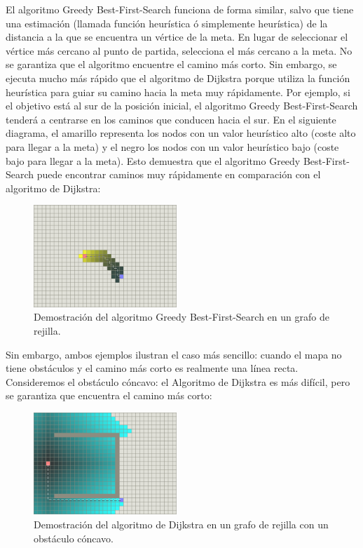 \documentclass[reprint,amsmath,amssymb,aps]{revtex4-2}
\begin{document}
El algoritmo Greedy Best-First-Search funciona de forma similar, salvo que tiene una estimación (llamada función heurística ó simplemente heurística) de la distancia a la que se encuentra un vértice de la meta. En lugar de seleccionar el vértice más cercano al punto de partida, selecciona el más cercano a la meta. No se garantiza que el algoritmo encuentre el camino más corto. Sin embargo, se ejecuta mucho más rápido que el algoritmo de Dijkstra porque utiliza la función heurística para guiar su camino hacia la meta muy rápidamente. Por ejemplo, si el objetivo está al sur de la posición inicial, el algoritmo Greedy Best-First-Search tenderá a centrarse en los caminos que conducen hacia el sur. En el siguiente diagrama, el amarillo representa los nodos con un valor heurístico alto (coste alto para llegar a la meta) y el negro los nodos con un valor heurístico bajo (coste bajo para llegar a la meta). Esto demuestra que el algoritmo Greedy Best-First-Search puede encontrar caminos muy rápidamente en comparación con el algoritmo de Dijkstra:

\begin{figure}[H]
 	\centering
 	\includegraphics[width=0.48\textwidth]{greedy.png}
 	\caption{Demostración del algoritmo Greedy Best-First-Search en un grafo de rejilla.}
 	\label{a}
\end{figure}

Sin embargo, ambos ejemplos ilustran el caso más sencillo: cuando el mapa no tiene obstáculos y el camino más corto es realmente una línea recta. Consideremos el obstáculo cóncavo: el Algoritmo de Dijkstra es más difícil, pero se garantiza que encuentra el camino más corto:

\begin{figure}[H]
 	\centering
 	\includegraphics[width=0.48\textwidth]{dijkstra-trap.png}
 	\caption{Demostración del algoritmo de Dijkstra en un grafo de rejilla con un obstáculo cóncavo.}
 	\label{dijkstra-trap}
\end{figure}
 
\end{document}
